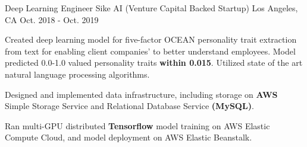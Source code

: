\cventry
    {Deep Learning Engineer} %
    {Sike AI (Venture Capital Backed Startup)} %
    {Los Angeles, CA} %
    {Oct. 2018 - Oct. 2019} %
    {
      \begin{cvitems} %
        \item {Created deep learning model for five-factor OCEAN personality trait extraction from text for enabling 
        client companies' to better understand employees. Model predicted 0.0-1.0 valued personality traits \textbf{within 0.015}.
        Utilized state of the art natural language processing algorithms.}
        \item {Designed and implemented data infrastructure, including storage on \textbf{AWS} Simple Storage Service
         and Relational Database Service \textbf{(MySQL)}.
        \item Ran multi-GPU distributed \textbf{Tensorflow} model training on AWS Elastic Compute Cloud, and model deployment on AWS Elastic Beanstalk.}
      \end{cvitems}
    }